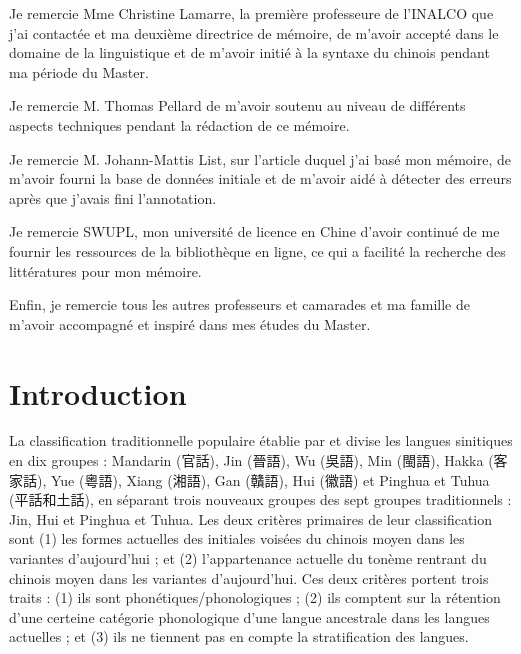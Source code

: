\documentclass{scrbook}
\newcounter{c}[subsubsection]
\begin{document}
\begin{sloppypar}
Je remercie Mme Christine Lamarre, la première professeure de l'INALCO que j'ai contactée et ma deuxième directrice de mémoire, de m'avoir accepté dans le domaine de la linguistique et de m'avoir initié à la syntaxe du chinois pendant ma période du Master. 

Je remercie M. Thomas Pellard de m'avoir soutenu au niveau de différents aspects techniques pendant la rédaction de ce mémoire.

Je remercie M. Johann-Mattis List, sur l'article duquel j'ai basé mon mémoire, de m'avoir fourni la base de données initiale et de m'avoir aidé à détecter des erreurs après que j'avais fini l'annotation.

Je remercie SWUPL, mon université de licence en Chine d'avoir continué de me fournir les ressources de la bibliothèque en ligne, ce qui a facilité la recherche des littératures pour mon mémoire.

Enfin, je remercie tous les autres professeurs et camarades et ma famille de m'avoir accompagné et inspiré dans mes études du Master.

\mainmatter
\chapter{Introduction}
La classification traditionnelle populaire établie par \textcite{li1987atlas} et \textcite{xiong2012atlas} divise les langues sinitiques en dix groupes : Mandarin (官話), Jin (晉語), Wu (吳語), Min (閩語), Hakka (客家話), Yue (粵語), Xiang (湘語), Gan (贛語), Hui (徽語) et Pinghua et Tuhua (平話和土話), en séparant trois nouveaux groupes des sept groupes traditionnels : Jin, Hui et Pinghua et Tuhua. Les deux critères primaires de leur classification sont (1) les formes actuelles des initiales voisées du chinois moyen dans les variantes d'aujourd'hui ; et (2) l'appartenance actuelle du tonème rentrant du chinois moyen dans les variantes d'aujourd'hui. Ces deux critères portent trois traits : (1) ils sont phonétiques/phonologiques ; (2) ils comptent sur la rétention d'une certeine catégorie phonologique d'une langue ancestrale dans les langues actuelles ; et (3) ils ne tiennent pas en compte la stratification des langues. 


\end{sloppypar}
\end{document}
